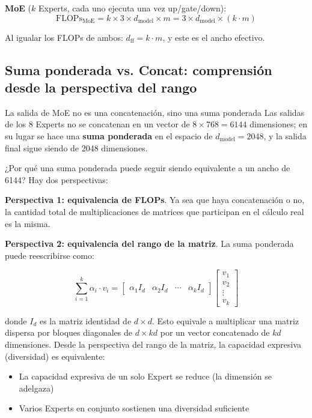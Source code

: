 \documentclass[a4paper]{article}
\begin{document}
\textbf{MoE} ($k$ Experts, cada uno ejecuta una vez up/gate/down):
$$
\text{FLOPs}_{\text{MoE}} = k \times 3 \times d_{\text{model}} \times m = 3 \times d_{\text{model}} \times (k \cdot m)
$$

Al igualar los FLOPs de ambos: $d_{\text{ff}} = k \cdot m$, y este es el ancho efectivo.

\subsection{Suma ponderada vs. Concat: comprensión desde la perspectiva del rango}

\begin{warningbox}{La salida de MoE no es una concatenación, sino una suma ponderada}
Las salidas de los 8 Experts no se concatenan en un vector de $8 \times 768 = 6144$ dimensiones; en su lugar se hace una \textbf{suma ponderada} en el espacio de $d_{\text{model}} = 2048$, y la salida final sigue siendo de 2048 dimensiones.
\end{warningbox}

¿Por qué una suma ponderada puede seguir siendo equivalente a un ancho de 6144? Hay dos perspectivas:

\textbf{Perspectiva 1: equivalencia de FLOPs}. Ya sea que haya concatenación o no, la cantidad total de multiplicaciones de matrices que participan en el cálculo real es la misma.

\textbf{Perspectiva 2: equivalencia del rango de la matriz}. La suma ponderada puede reescribirse como:

$$
\sum_{i=1}^{k} \alpha_i \cdot v_i = \begin{bmatrix} \alpha_1 I_d & \alpha_2 I_d & \cdots & \alpha_k I_d \end{bmatrix} \begin{bmatrix} v_1 \\ v_2 \\ \vdots \\ v_k \end{bmatrix}
$$

donde $I_d$ es la matriz identidad de $d \times d$. Esto equivale a multiplicar una matriz dispersa por bloques diagonales de $d \times kd$ por un vector concatenado de $kd$ dimensiones. Desde la perspectiva del rango de la matriz, la capacidad expresiva (diversidad) es equivalente:
\begin{itemize}
  \item La capacidad expresiva de un solo Expert se reduce (la dimensión se adelgaza)
  \item Varios Experts en conjunto sostienen una diversidad suficiente
\end{itemize}
\end{document}
